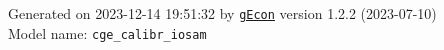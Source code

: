 \documentclass[10pt,a4paper]{article}
\numberwithin{equation}{section}
\begin{document}
\begin{landscape}
\begin{flushleft}{\large
Generated  on 2023-12-14 19:51:32 by \href{http://gecon.r-forge.r-project.org/}{\texttt{gEcon}} version 1.2.2 (2023-07-10)\\
Model name: \verb+cge_calibr_iosam+
}\end{flushleft}


\end{landscape}

\end{document}
